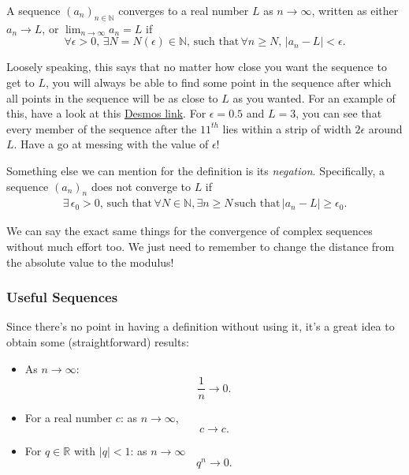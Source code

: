 \documentclass[
  12pt,
  a4paper]{extarticle}
\providecommand{\tightlist}{%
  \setlength{\itemsep}{0pt}\setlength{\parskip}{0pt}}
\theoremstyle{plain}
\theoremstyle{definition}
\theoremstyle{plain}
\theoremstyle{plain}
\theoremstyle{plain}
\theoremstyle{plain}
\theoremstyle{definition}
\theoremstyle{definition}
\theoremstyle{remark}
\theoremstyle{remark}
\let\BeginKnitrBlock\begin \let\EndKnitrBlock\end
\renewcommand{\;}{\,}
\begin{document}
\BeginKnitrBlock{definition}[Sequence Convergence]
{\label{def:def2} }A sequence \((a_n)_{n\in\mathbb{N}}\) converges to a real number \(L\) as \(n \longrightarrow \infty\), written as either \(a_n \longrightarrow L\), or \(\lim_{n \to \infty}a_n = L\) if \[\forall \epsilon > 0, \; \exists N = N(\epsilon) \in \mathbb{N}, \; \text{such that} \; \forall n \geq N, \; \lvert a_n - L \rvert < \epsilon.\]
\EndKnitrBlock{definition}
Loosely speaking, this says that no matter how close you want the sequence to get to \(L\), you will always be able to find some point in the sequence after which all points in the sequence will be as close to \(L\) as you wanted. For an example of this, have a look at this \href{https://www.desmos.com/calculator/dfkjgg0wzj}{Desmos link}. For \(\epsilon = 0.5\) and \(L = 3\), you can see that every member of the sequence after the \(11^{th}\) lies within a strip of width \(2\epsilon\) around \(L\). Have a go at messing with the value of \(\epsilon\)!

Something else we can mention for the definition is its \emph{negation}. Specifically, a sequence \((a_n)_n\) does not converge to \(L\) if
\begin{align*}
    \exists\; \epsilon_0 > 0, \; \text{such that} \; \forall N \in \mathbb{N}, \exists n \geq N \; \text{such that} \; \lvert a_n - L \rvert \geq \epsilon_0.
\end{align*}

We can say the exact same things for the convergence of complex sequences without much effort too. We just need to remember to change the distance from the absolute value to the modulus!

\hypertarget{useful-sequences}{%
\subsubsection{Useful Sequences}\label{useful-sequences}}

Since there's no point in having a definition without using it, it's a great idea to obtain some (straightforward) results:

\begin{itemize}
\tightlist
\item
  As \(n \longrightarrow \infty\): \[\frac{1}{n} \longrightarrow 0.\]
\item
  For a real number \(c\): as \(n \longrightarrow \infty\), \[c \longrightarrow c.\]
\item
  For \(q \in \mathbb{R}\) with \(\lvert q \rvert < 1\): as \(n \longrightarrow \infty\) \[q^n \longrightarrow 0.\]
\end{itemize}
\end{document}
